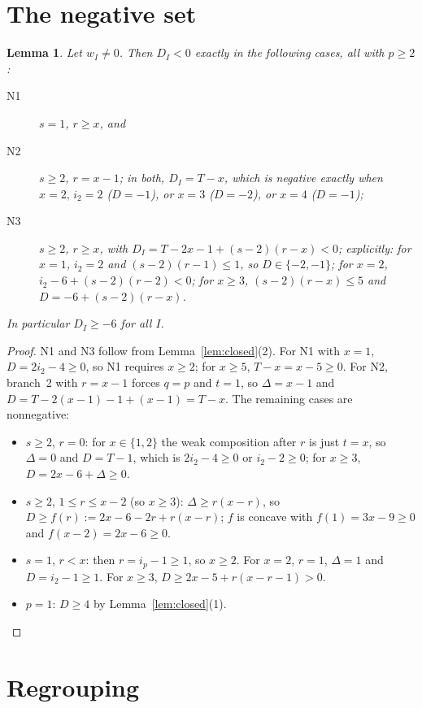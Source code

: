 \documentclass[11pt]{article}
\newtheorem{lemma}{Lemma}
\theoremstyle{remark}
\theoremstyle{definition}
\begin{document}
\section{The negative set}

\begin{lemma}\label{lem:neg}
Let $w_I\ne0$. Then $D_I<0$ exactly in the following cases, all with $p\ge2$:
\begin{description}
\item[N1] $s=1$, $r\ge x$, and
\item[N2] $s\ge2$, $r=x-1$; in both, $D_I=T-x$, which is negative exactly when $x=2,\,i_2=2$ ($D=-1$), or $x=3$ ($D=-2$), or $x=4$ ($D=-1$);
\item[N3] $s\ge2$, $r\ge x$, with $D_I=T-2x-1+(s-2)(r-x)<0$; explicitly: for $x=1$, $i_2=2$ and $(s-2)(r-1)\le1$, so $D\in\{-2,-1\}$; for $x=2$, $i_2-6+(s-2)(r-2)<0$; for $x\ge3$, $(s-2)(r-x)\le5$ and $D=-6+(s-2)(r-x)$.
\end{description}
In particular $D_I\ge-6$ for all $I$.
\end{lemma}
\begin{proof}
N1 and N3 follow from Lemma~\ref{lem:closed}(2). For N1 with $x=1$, $D=2i_2-4\ge0$, so N1 requires $x\ge2$; for $x\ge5$, $T-x=x-5\ge0$. For N2, branch~2 with $r=x-1$ forces $q=p$ and $t=1$, so $\Delta=x-1$ and $D=T-2(x-1)-1+(x-1)=T-x$. The remaining cases are nonnegative:
\begin{itemize}
\item $s\ge2$, $r=0$: for $x\in\{1,2\}$ the weak composition after $r$ is just $t=x$, so $\Delta=0$ and $D=T-1$, which is $2i_2-4\ge0$ or $i_2-2\ge0$; for $x\ge3$, $D=2x-6+\Delta\ge0$.
\item $s\ge2$, $1\le r\le x-2$ (so $x\ge3$): $\Delta\ge r(x-r)$, so $D\ge f(r):=2x-6-2r+r(x-r)$; $f$ is concave with $f(1)=3x-9\ge0$ and $f(x-2)=2x-6\ge0$.
\item $s=1$, $r<x$: then $r=i_p-1\ge1$, so $x\ge2$. For $x=2$, $r=1$, $\Delta=1$ and $D=i_2-1\ge1$. For $x\ge3$, $D\ge2x-5+r(x-r-1)>0$.
\item $p=1$: $D\ge4$ by Lemma~\ref{lem:closed}(1).\qedhere
\end{itemize}
\end{proof}

\section{Regrouping}
\end{document}
